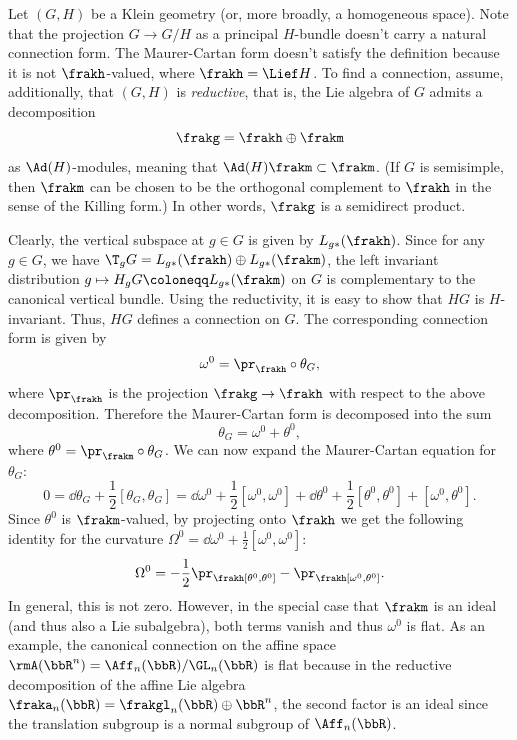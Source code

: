 \begin{example}\label{ex 1.3.19 RS2}
    Let $(G,H)$ be a Klein geometry (or, more broadly, a homogeneous space). Note that the projection $G\to G\slash H$ as a principal $H$-bundle doesn't carry a natural connection form. The Maurer-Cartan form doesn't satisfy the definition because it is not $\frakh$-valued, where $\frakh=\Lief H$. To find a connection, assume, additionally, that $(G,H)$ is \emph{reductive}, that is, the Lie algebra of $G$ admits a decomposition
    \[\frakg=\frakh\oplus\frakm\]
    as $\Ad(H)$-modules, meaning that $\Ad(H)\frakm\subset \frakm$. (If $G$ is semisimple, then $\frakm$ can be chosen to be the orthogonal complement to $\frakh$ in the sense of the Killing form.) In other words, $\frakg$ is a semidirect product.

    Clearly, the vertical subspace at $g\in G$ is given by $L_{g\ast}(\frakh)$. Since for any $g\in G$, we have $\T_gG=L_{g\ast}(\frakh)\oplus L_{g\ast}(\frakm)$, the left invariant distribution $g\mapsto H_gG\coloneqq L_{g\ast}(\frakm)$ on $G$ is complementary to the canonical vertical bundle. Using the reductivity, it is easy to show that $HG$ is $H$-invariant. Thus, $HG$ defines a connection on $G$. The corresponding connection form is given by
    \[\omega^0=\pr_\frakh\circ \theta_G,\]
    where $\pr_\frakh$ is the projection $\frakg\to \frakh$ with respect to the above decomposition. Therefore the Maurer-Cartan form is decomposed into the sum
    \[\theta_G=\omega^0+\theta^0,\]
    where $\theta^0=\pr_{\frakm}\circ\theta_G$. We can now expand the Maurer-Cartan equation for $\theta_G$:
    \[0=\dd \theta_G+\frac12[\theta_G,\theta_G]=\dd \omega^0+\frac12[\omega^0,\omega^0]+\dd \theta^0+\frac12[\theta^0,\theta^0]+[\omega^0,\theta^0].\]
    Since $\theta^0$ is $\frakm$-valued, by projecting onto $\frakh$ we get the following identity for the curvature $\Omega^0=\dd\omega^0+\frac12[\omega^0,\omega^0]$:
    \[\Omega^0=-\frac12\pr_\frakh[\theta^0,\theta^0]-\pr_\frakh[\omega^0,\theta^0].\]
    In general, this is not zero. However, in the special case that $\frakm$ is an ideal (and thus also a Lie subalgebra), both terms vanish and thus $\omega^0$ is flat. As an example, the canonical connection on the affine space $\rmA(\bbR^n)=\Aff_n(\bbR)\slash \GL_n(\bbR)$ is flat because in the reductive decomposition of the affine Lie algebra $\fraka_n(\bbR)=\frakgl_n(\bbR)\oplus \bbR^n$, the second factor is an ideal since the translation subgroup is a normal subgroup of $\Aff_n(\bbR)$.
\end{example}

